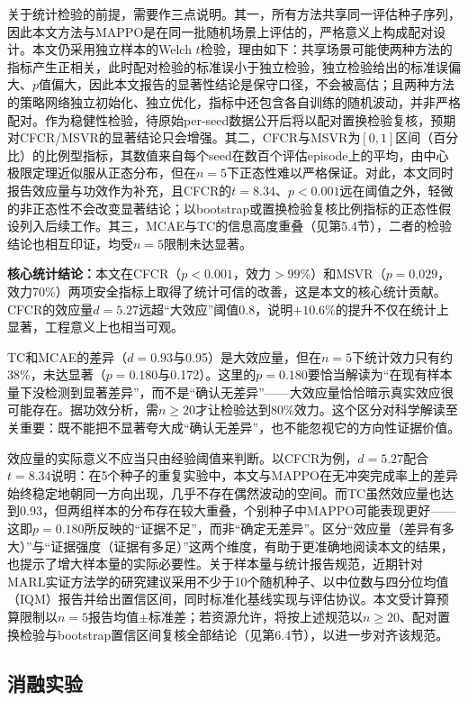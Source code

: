 \documentclass[12pt,a4paper,UTF8]{ctexart}
\begin{document}
关于统计检验的前提，需要作三点说明。其一，所有方法共享同一评估种子序列，因此本文方法与MAPPO是在同一批随机场景上评估的，严格意义上构成配对设计。本文仍采用独立样本的Welch $t$检验，理由如下：共享场景可能使两种方法的指标产生正相关，此时配对检验的标准误小于独立检验，独立检验给出的标准误偏大、$p$值偏大，因此本文报告的显著性结论是保守口径，不会被高估；且两种方法的策略网络独立初始化、独立优化，指标中还包含各自训练的随机波动，并非严格配对。作为稳健性检验，待原始per-seed数据公开后将以配对置换检验复核，预期对CFCR/MSVR的显著结论只会增强。其二，CFCR与MSVR为$[0,1]$区间（百分比）的比例型指标，其数值来自每个seed在数百个评估episode上的平均，由中心极限定理近似服从正态分布，但在$n=5$下正态性难以严格保证。对此，本文同时报告效应量与功效作为补充，且CFCR的$t=8.34$、$p<0.001$远在阈值之外，轻微的非正态性不会改变显著结论；以bootstrap或置换检验复核比例指标的正态性假设列入后续工作。其三，MCAE与TC的信息高度重叠（见第5.4节），二者的检验结论也相互印证，均受$n=5$限制未达显著。

\textbf{核心统计结论：}本文在CFCR（$p<0.001$，效力$>99\%$）和MSVR（$p=0.029$，效力70\%）两项安全指标上取得了统计可信的改善，这是本文的核心统计贡献。CFCR的效应量$d=5.27$远超“大效应”阈值0.8，说明$+10.6\%$的提升不仅在统计上显著，工程意义上也相当可观。

TC和MCAE的差异（$d=0.93$与0.95）是大效应量，但在$n=5$下统计效力只有约38\%，未达显著（$p=0.180$与0.172）。这里的$p=0.180$要恰当解读为“在现有样本量下没检测到显著差异”，而不是“确认无差异”——大效应量恰恰暗示真实效应很可能存在。据功效分析，需$n\geq20$才让检验达到80\%效力。这个区分对科学解读至关重要：既不能把不显著夸大成“确认无差异”，也不能忽视它的方向性证据价值。

效应量的实际意义不应当只由经验阈值来判断。以CFCR为例，$d=5.27$配合$t=8.34$说明：在5个种子的重复实验中，本文与MAPPO在无冲突完成率上的差异始终稳定地朝同一方向出现，几乎不存在偶然波动的空间。而TC虽然效应量也达到0.93，但两组样本的分布存在较大重叠，个别种子中MAPPO可能表现更好——这即$p=0.180$所反映的“证据不足”，而非“确定无差异”。区分“效应量（差异有多大）”与“证据强度（证据有多足）”这两个维度，有助于更准确地阅读本文的结果，也提示了增大样本量的实际必要性。关于样本量与统计报告规范，近期针对MARL实证方法学的研究\cite{ref59}建议采用不少于10个随机种子、以中位数与四分位均值（IQM）报告并给出置信区间，同时标准化基线实现与评估协议。本文受计算预算限制以$n=5$报告均值$\pm$标准差；若资源允许，将按上述规范以$n\geq20$、配对置换检验与bootstrap置信区间复核全部结论（见第6.4节），以进一步对齐该规范。

\subsection{消融实验}
\end{document}
